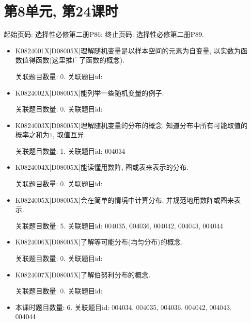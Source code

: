 \section*{第8单元, 第24课时}
起始页码: 选择性必修第二册P86; 终止页码: 选择性必修第二册P89.
\begin{itemize}
\item K0824001X|D08005X|理解随机变量是以样本空间的元素为自变量, 以实数为函数值得函数(这里推广了函数的概念).

关联题目数量: 0. 关联题目id: 

\item K0824002X|D08005X|能列举一些随机变量的例子.

关联题目数量: 0. 关联题目id: 

\item K0824003X|D08005X|理解随机变量的分布的概念, 知道分布中所有可能取值的概率之和为$1$, 取值互异.

关联题目数量: 1. 关联题目id: 004034

\item K0824004X|D08005X|能读懂用数阵, 图或表来表示的分布.

关联题目数量: 0. 关联题目id: 

\item K0824005X|D08005X|会在简单的情境中计算分布, 并规范地用数阵或图来表示.

关联题目数量: 5. 关联题目id: 004035, 004036, 004042, 004043, 004044

\item K0824006X|D08005X|了解等可能分布(均匀分布)的概念.

关联题目数量: 0. 关联题目id: 

\item K0824007X|D08005X|了解伯努利分布的概念.

关联题目数量: 0. 关联题目id: 

\item 本课时题目数量: 6. 关联题目id: 004034, 004035, 004036, 004042, 004043, 004044

\end{itemize}


